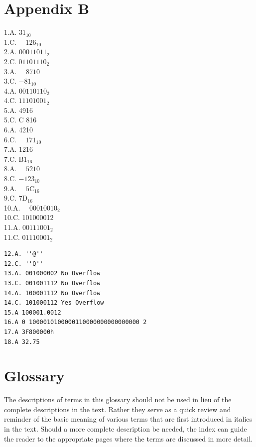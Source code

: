 \documentclass[10pt]{book}
\begin{document}
\section*{Appendix B}
1.A. $31_{10}$\\
1.C. $\quad 126_{10}$\\
2.A. $00011011_{2}$\\
2.C. $01101110_{2}$\\
3.A. $\quad 8710$\\
3.C. $-81_{10}$\\
4.A. $00110110_{2}$\\
4.C. $11101001_{2}$\\
5.A. 4916\\
5.C. C 816\\
6.A. 4210\\
6.C. $\quad 171_{10}$\\
7.A. 1216\\
7.C. $\mathrm{B} 1_{16}$\\
8.A. $\quad 5210$\\
8.C. $-123_{10}$\\
9.A. $\quad 5 \mathrm{C}_{16}$\\
9.C. $7 \mathrm{D}_{16}$\\
10.A. $\quad 00010010_{2}$\\
10.C. 101000012\\
11.A. $00111001_{2}$\\
11.C. $01110001_{2}$

\begin{verbatim}
12.A. ''@''
12.C. ''Q''
13.A. 001000002 No Overflow
13.C. 001001112 No Overflow
14.A. 100001112 No Overflow
14.C. 101000112 Yes Overflow
15.A 100001.0012
16.A 0 1000010100000110000000000000000 2
17.A 3F800000h
18.A 32.75
\end{verbatim}

\section*{Glossary}
The descriptions of terms in this glossary should not be used in lieu of the complete descriptions in the text. Rather they serve as a quick review and reminder of the basic meaning of various terms that are first introduced in italics in the text. Should a more complete description be needed, the index can guide the reader to the appropriate pages where the terms are discussed in more detail.
\end{document}

